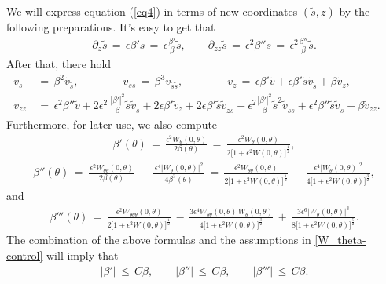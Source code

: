 \documentclass[10pt, reqno]{amsart}
\numberwithin{equation}{section}
\theoremstyle{definition}
\def\p{\partial}
\begin{document}
{We will express equation (\ref{eq4}) in terms of new coordinates $({\tilde s}, z)$ by the following preparations.
It's easy to get that
\begin{align*}
\p_z {\tilde s}
 \,=\,
 \epsilon\beta's \,=\, \epsilon\frac{\beta'}{\beta}{\tilde s},
\qquad
\p_{zz} {\tilde s} \,=\, \epsilon^2\beta''s
\,=\,
\epsilon^2\frac{\beta''}{\beta}{\tilde s}.
\end{align*}
After that, there hold
\begin{align*}
v_{s}& \,=\, \beta^2{\tilde v}_{\tilde s},
\qquad\qquad
v_{ss} \,=\, \beta^3{\tilde v}_{{\tilde s}{\tilde s}},
\qquad\qquad
v_z \,=\, \epsilon\beta' {\tilde v} +\epsilon \beta' {\tilde s}{\tilde v}_{\tilde s} +\beta {\tilde v}_z,
\qquad\qquad
\\[2mm]
v_{zz}&
\,=\,
\epsilon^2\beta'' {\tilde v}
+ 2 \epsilon^2\, \frac{|\beta'|^2}{\beta} {\tilde s} {\tilde v}_{\tilde s}
+2 \epsilon \beta' {\tilde v}_z
+2\epsilon \beta' {\tilde s} {\tilde v}_{z{\tilde s}}
+ \epsilon^2 \frac{|\beta'|^2}{\beta} {\tilde s}^2 {\tilde v}_{{\tilde s}{\tilde s}}
+ \epsilon^2 \beta'' {\tilde s} {\tilde v}_{\tilde s}
+ \beta {\tilde v}_{zz}.
\end{align*}
Furthermore, for later use, we also compute
\begin{align}
\label{beta'}
\beta' (\theta)
\,=\,
\frac{ \epsilon^2 W_\theta(0, \theta)}{ 2 \beta(\theta)}
\,=\,
\frac{ \epsilon^2 W_\theta(0, \theta)}{ 2 \big[1+ \epsilon^2 W(0, \theta) \big]^{\frac 12}},
\end{align}
\begin{align}
\label{beta''}
\beta'' (\theta)
\,=\,
\frac{ \, \epsilon^2 W_{\theta \theta}(0, \theta)\, }{2\beta(\theta)}
\,-\,
\frac{\, \epsilon^4|W_{\theta}(0, \theta)|^2\, }{4\beta^3(\theta)}
\,=\,
\frac{ \, \epsilon^2 W_{\theta \theta}(0, \theta)\, }{2\big[1+ \epsilon^2 W(0, \theta) \big]^{\frac{1}{2}}}
\,-\,
\frac{\, \epsilon^4|W_{\theta}(0, \theta)|^2\, }{4\big[1+ \epsilon^2 W(0, \theta) \big]^{\frac 3 2}},
\end{align}
and
\begin{align}
\label{beta'''}
\beta'''(\theta)
\,=\,
\frac{ \, \epsilon^2 W_{\theta \theta \theta}(0, \theta)\, }{2\big[1+ \epsilon^2 W(0, \theta) \big]^{\frac{1}{2}}}
\,-\,\frac{ 3\epsilon^4 W_{\theta \theta}(0, \theta)\,W_{\theta }(0, \theta) }{4\big[1+ \epsilon^2 W(0, \theta) \big]^{\frac 3 2}}
\,+\,
\frac{\,3 \epsilon^6|W_{\theta}(0, \theta)|^3\, }{8\big[1+ \epsilon^2 W(0, \theta) \big]^{\frac 5 2}}.
\end{align}
The combination of the above formulas and the assumptions in \eqref{W_theta-control} will imply that
\begin{align}
|\beta'|\,\leq\, C\beta,
\qquad
|\beta''|\,\leq\, C\beta,
\qquad
|\beta'''|\,\leq\, C\beta.
\label{beta-bound}
\end{align}


}
\end{document}
